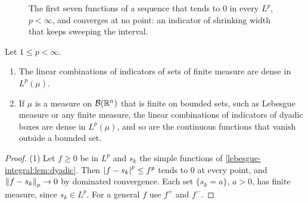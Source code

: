 \begin{notechapter}
\begin{figure}[ht]
\centering
{}
\caption{The first seven functions of a sequence that tends to $0$ in
every $L^p$, $p < \infty$, and converges at no point: an indicator of
shrinking width that keeps sweeping the interval.}
\label{lp-spaces:fig:typewriter}
\end{figure}

\begin{theorem}\label{lp-spaces:thm:dense}
Let $1\leq p < \infty$.
\begin{enumerate}[nosep]
  \item The linear combinations of indicators of sets of finite measure
        are dense in $L^p(\mu)$.
  \item If $\mu$ is a measure on $\mathcal B(\mathbb{R}^n)$ that is finite on
        bounded sets, such as Lebesgue measure or any finite measure,
        the linear combinations of indicators of dyadic boxes are dense
        in $L^p(\mu)$, and so are the continuous functions that vanish
        outside a bounded set.
\end{enumerate}
\end{theorem}

\begin{proof}
(1) Let $f\geq0$ be in $L^p$ and $s_k$ the simple functions of
\cref{lebesgue-integral:lem:dyadic}. Then $\left|f - s_k\right|^p\leq f^p$
tends to $0$ at every point, and $\left\|f - s_k\right\|_p\to0$ by dominated
convergence. Each set $\{s_k = a\}$, $a > 0$, has finite measure, since
$s_k\in L^p$. For a general $f$ use $f^+$ and $f^-$.


\end{proof}
\end{notechapter}
